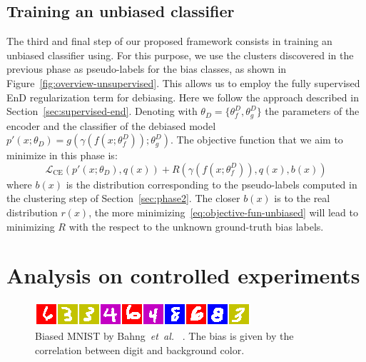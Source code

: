 \subsection{Training an unbiased classifier}
\label{sec:phase3}
The third and final step of our proposed framework consists in training an unbiased classifier using. For this purpose, we use the clusters discovered in the previous phase as pseudo-labels for the bias classes, as shown in Figure~\ref{fig:overview-unsupervised}. This allows us to employ the fully supervised EnD regularization term for debiasing. Here we follow the approach described in Section~\ref{sec:supervised-end}.
Denoting with $\theta_D = \{\theta_f^D, \theta_g^D\}$ the parameters of the encoder and the classifier of the debiased model $p'(x; \theta_D) = g(\gamma(f(x; \theta_f^D)); \theta_g^D)$.
The objective function that we aim to minimize in this phase is:
\begin{equation}
    \label{eq:objective-fun-unbiased}
    \mathcal{L}_\text{CE}(p'(x; \theta_D), q(x)) + R(\gamma(f(x; \theta_f^D)), q(x), b(x))
\end{equation}
where $b(x)$ is the distribution corresponding to the pseudo-labels computed in the clustering step of Section~\ref{sec:phase2}. The closer $b(x)$ is to the real distribution $r(x)$, the more minimizing~\eqref{eq:objective-fun-unbiased} will lead to minimizing $R$ with the respect to the unknown ground-truth bias labels.

\section{Analysis on controlled experiments}
\label{sec:analysis-mnist}

\begin{figure}
    \centering
    \includegraphics[width=\columnwidth]{img/mnist.png}
    \caption{Biased MNIST by Bahng~\emph{et~al.} ~\cite{bahng2019rebias}. The bias is given by the correlation between digit and background color.}
    \label{fig:biased-mnist}
\end{figure}

